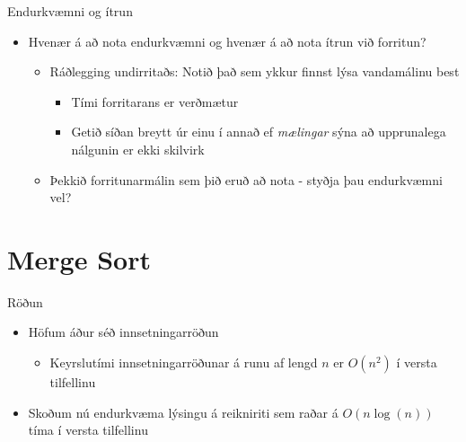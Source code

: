 \documentclass[handout]{beamer}
\begin{document}
\begin{frame}{Endurkvæmni og ítrun}
\begin{itemize}
 \item Hvenær á að nota endurkvæmni og hvenær á að nota ítrun við forritun? \pause
 \begin{itemize}
  \item Ráðlegging undirritaðs: Notið það sem ykkur finnst lýsa vandamálinu best
  \begin{itemize}
   \item Tími forritarans er verðmætur
   \item Getið síðan breytt úr einu í annað ef \emph{mælingar} sýna að upprunalega nálgunin er ekki skilvirk
  \end{itemize}
  \item Þekkið forritunarmálin sem þið eruð að nota - styðja þau endurkvæmni vel?
 \end{itemize}
\end{itemize}
\end{frame}

\section{Merge Sort}

\begin{frame}{Röðun}
\begin{itemize}
 \item Höfum áður séð innsetningarröðun
 \begin{itemize}
  \item Keyrslutími innsetningarröðunar á runu af lengd $n$ er $O(n^2)$ í versta tilfellinu
 \end{itemize}
 \item Skoðum nú endurkvæma lýsingu á reikniriti sem raðar á $O(n\log(n))$ tíma í versta tilfellinu
\end{itemize}
\end{frame}
\end{document}
